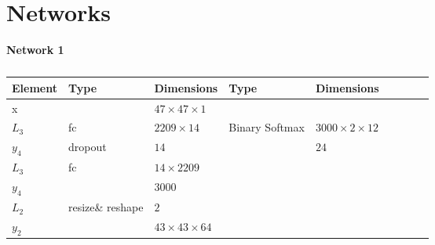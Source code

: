 \appendix
%
\chapter{Networks} \label{appendix1}

\begin{table}[h!]
\centering
\caption*{{\bf \large Network 1}}
{\footnotesize
\begin{tabular}{|lllllllll|}
\hline
\multicolumn{1}{|l|}{Element} & Type     & \multicolumn{1}{l|}{Dimensions}                     & Type     & \multicolumn{1}{l|}{Dimensions}  \\ \hline
\multicolumn{1}{|l|}{x}       &          & \multicolumn{1}{l|}{$47\times47\times1$}            &          & \multicolumn{1}{l|}{}        \\ \hline
\multicolumn{1}{|l|}{$L_3$}   & fc       & \multicolumn{1}{l|}{$2209\times14$}              & Binary Softmax & \multicolumn{1}{l|}{$3000\times2\times12$}        \\
\multicolumn{1}{|l|}{$y_4$}   & dropout  & \multicolumn{1}{l|}{$14$}                         &          & \multicolumn{1}{l|}{$24$}        \\ \hline
\multicolumn{1}{|l|}{$L_3$}   & fc       & \multicolumn{1}{l|}{$14\times2209$}              &          & \multicolumn{1}{l|}{}        \\
\multicolumn{1}{|l|}{$y_4$}   &          & \multicolumn{1}{l|}{$3000$}                         &          & \multicolumn{1}{l|}{}        \\ \hline
\multicolumn{1}{|l|}{$L_2$}   & resize\& reshape & \multicolumn{1}{l|}{$2$}                    &          & \multicolumn{1}{l|}{}        \\
\multicolumn{1}{|l|}{$y_2$}   &          & \multicolumn{1}{l|}{$43\times43\times 64$}          &          & \multicolumn{1}{l|}{}        \\ \hline
\end{tabular}

\caption{}

}
\end{table}

